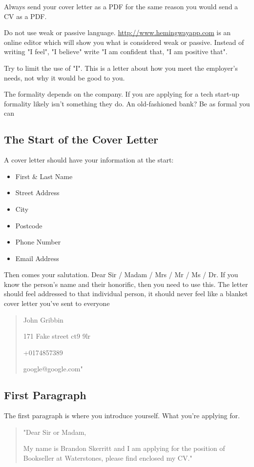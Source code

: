 \documentclass{article}
\begin{document}
Always send your cover letter as a PDF for the same reason you would
send a CV as a PDF.

Do not use weak or passive language. \href{http://www.hemingwayapp.com}{{http://www.hemingwayapp.com}} is an
online editor which will show you what is considered weak or passive.
Instead of writing "I feel", "I believe" write "I am confident that, "I
am positive that".

Try to limit the use of "I". This is a letter about how you meet the
employer's needs, not why it would be good to you.

The formality depends on the company. If you are applying for a tech
start-up formality likely isn't something they do. An old-fashioned
bank? Be as formal you can

\subsection{The Start of the Cover Letter}
A cover letter should have your information at the start:
\begin{itemize}
    \item First \& Last Name
    \item Street Address
    \item City
    \item Postcode
    \item Phone Number
    \item Email Address
\end{itemize}
Then comes your salutation. Dear Sir / Madam / Mrs / Mr / Ms / Dr. If
you know the person's name and their honorific, then you need to use
this. The letter should feel addressed to that individual person, it
should never feel like a blanket cover letter you've sent to everyone

\begin{quote}
John Gribbin

171 Fake street ct9 9lr

+0174857389

google@google.com"
\end{quote}
\subsection{First Paragraph}
The first paragraph is where you introduce yourself. What you're
applying for.

\begin{quote}"Dear Sir or Madam,

My name is Brandon Skerritt and I am applying for the position of
Bookseller at Waterstones, please find enclosed my CV."\end{quote}
\end{document}
